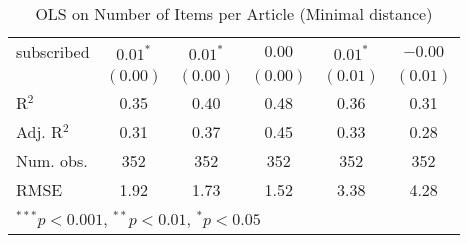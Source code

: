 \begin{table}[!h]
\begin{center}
\begin{tabular}{l c c c c c }
subscribed              & $0.01^{*}$   & $0.01^{*}$   & $0.00$       & $0.01^{*}$   & $-0.00$      \\
                        & $(0.00)$     & $(0.00)$     & $(0.00)$     & $(0.01)$     & $(0.01)$     \\
\midrule
R$^2$                   & 0.35         & 0.40         & 0.48         & 0.36         & 0.31         \\
Adj. R$^2$              & 0.31         & 0.37         & 0.45         & 0.33         & 0.28         \\
Num. obs.               & 352          & 352          & 352          & 352          & 352          \\
RMSE                    & 1.92         & 1.73         & 1.52         & 3.38         & 4.28         \\
\bottomrule
\multicolumn{6}{l}{\scriptsize{$^{***}p<0.001$, $^{**}p<0.01$, $^*p<0.05$}}
\end{tabular}
\caption{OLS on Number of Items per Article (Minimal distance)}
\label{table:coefficients}
\end{center}
\end{table}
